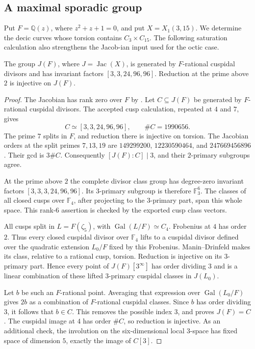 \subsection{A maximal sporadic group}
Put $F=\mathbb Q(z)$, where $z^2+z+1=0$, and put $X=X_1(3,15)$.
We determine the decic curves whose torsion contains $C_3\times C_{15}$.
The following saturation calculation also strengthens the
Jacob-ian input used for the octic case.

\begin{lemma}\label{lem:315-cuspidal-generation}
The group $J(F)$, where $J=\operatorname{Jac}(X)$, is generated by
$F$-rational cuspidal divisors and has invariant factors
$[3,3,24,96,96]$. Reduction at the prime above $2$ is injective on $J(F)$.
\end{lemma}
\begin{proof}
The Jacobian has rank zero over $F$ by \cite[Theorem~4.1]{DS}.
Let $C\subseteq J(F)$ be generated by $F$-rational cuspidal divisors.
The accepted cusp calculation, repeated at $4$ and $7$, gives
\[
 C\simeq[3,3,24,96,96],\qquad \#C=1990656.
\]
The prime $7$ splits in $F$, and reduction there is injective on torsion.
The Jacobian orders at the split primes $7,13,19$ are
$149299200$, $12230590464$, and $247669456896$.
Their gcd is $3\#C$. Consequently $[J(F):C]\mid3$, and their
$2$-primary subgroups agree.

At the prime above $2$ the complete divisor class group has degree-zero
invariant factors $[3,3,3,24,96,96]$. Its $3$-primary subgroup
is therefore $\mathbb F_3^6$.
The classes of all closed cusps over $\mathbb F_4$, after projecting
to the $3$-primary part, span this whole space. This rank-$6$
assertion is checked by the exported cusp class vectors.

All cusps split in $L=F(\zeta_5)$, with
$\operatorname{Gal}(L/F)\simeq C_4$. Frobenius at $4$ has order $2$.
Thus every closed cuspidal divisor over $\mathbb F_4$ lifts to a
cuspidal divisor defined over the quadratic extension
$L_0/F$ fixed by this Frobenius. Manin--Drinfeld makes its
class, relative to a rational cusp, torsion.
Reduction is injective on its $3$-primary part. Hence every
point of $J(F)[3^\infty]$ has order dividing $3$ and is a
linear combination of these lifted $3$-primary cuspidal classes
in $J(L_0)$.

Let $b$ be such an $F$-rational point. Averaging that expression
over $\operatorname{Gal}(L_0/F)$ gives $2b$ as a combination of
$F$-rational cuspidal classes. Since $b$ has order dividing $3$,
it follows that $b\in C$. This removes the possible index $3$,
and proves $J(F)=C$.
The cuspidal image at $4$ has order $\#C$, so reduction is injective.
As an additional check, the involution on the six-dimensional local
$3$-space has fixed space of dimension $5$, exactly the image of $C[3]$.
\end{proof}

